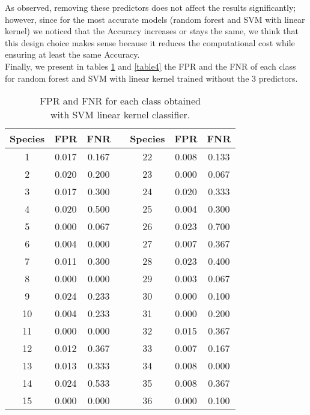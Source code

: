 \documentclass{article}
\begin{document}
As observed, removing these predictors does not affect the results significantly; however, since for the most accurate models (random forest and SVM with linear kernel) we noticed that the Accuracy increases or stays the same, we think that this design choice makes sense because it reduces the computational cost while ensuring at least the same Accuracy.
\\Finally, we present in tables \ref{table3} and \ref{table4} the FPR and the FNR of each class for random forest and SVM with linear kernel trained without the $3$ predictors. 

\begin{table}[h]\footnotesize
\begin{minipage}[]{7cm}
 \begin{adjustwidth}{-3cm}{}
\begin{tabular}{|c|c|c|c|c|c|c| } \hline
Species & FPR & FNR & & Species & FPR & FNR \\
\hline
1 & 0.017 & 0.167 & & 22 & 0.008 & 0.133 \\ 
\hline
2 & 0.020 & 0.200 & & 23 & 0.000 & 0.067 \\ 
\hline
 3 & 0.017 & 0.300 & & 24 & 0.020 & 0.333\\ 
\hline
 4 & 0.020 & 0.500 & & 25 & 0.004 & 0.300 \\ 
\hline
 5 & 0.000 & 0.067 & & 26 & 0.023 & 0.700 \\ 
\hline
 6 & 0.004 & 0.000 & & 27 & 0.007 & 0.367 \\ 
\hline
 7 & 0.011 & 0.300 & & 28 & 0.023 & 0.400 \\ 
\hline
 8 & 0.000 & 0.000 & & 29 & 0.003 & 0.067 \\ 
\hline
 9 & 0.024 & 0.233 & & 30 & 0.000 & 0.100  \\ 
\hline
 10 & 0.004 & 0.233 & & 31 &  0.000 & 0.200 \\ 
\hline
 11 & 0.000 & 0.000 & & 32 & 0.015 & 0.367 \\ 
\hline
 12 & 0.012 & 0.367 & & 33 & 0.007 & 0.167\\ 
\hline
 13 & 0.013 & 0.333 & & 34 & 0.008 & 0.000\\ 
\hline
 14 & 0.024 & 0.533 & & 35 & 0.008 & 0.367\\ 
\hline
 15 & 0.000 & 0.000 & & 36 & 0.000 & 0.100\\  
\hline
\end{tabular}
\caption{FPR and FNR for each class obtained \\ with SVM linear kernel classifier.}\label{table3}
\end{adjustwidth}

\end{minipage}
\end{table}
\end{document}
